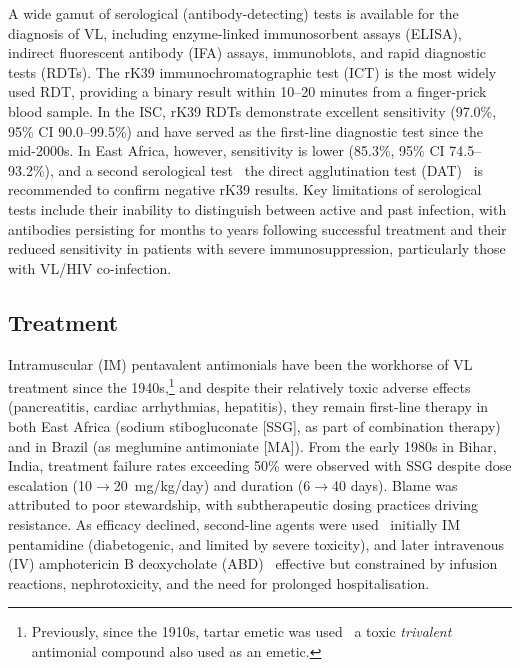 A wide gamut of serological (antibody-detecting) tests is available for the diagnosis of VL, including enzyme-linked immunosorbent assays (ELISA), indirect fluorescent antibody (IFA) assays, immunoblots, and rapid diagnostic tests (RDTs)\cite{farrar2023manson}. The rK39 immunochromatographic test (ICT) is the most widely used RDT, providing a binary result within 10--20 minutes from a finger-prick blood sample. In the ISC, rK39 RDTs demonstrate excellent sensitivity (97.0\%, 95\% CI 90.0--99.5\%)\cite{boelaert2014} and have served as the first-line diagnostic test since the mid-2000s. In East Africa, however, sensitivity is lower (85.3\%, 95\% CI 74.5--93.2\%), and a second serological test \textemdash\  the direct agglutination test (DAT) \textemdash\  is recommended to confirm negative rK39 results\cite{boelaert2014}. Key limitations of serological tests include their inability to distinguish between active and past infection, with antibodies persisting for months to years following successful treatment and their reduced sensitivity in patients with severe immunosuppression, particularly those with VL/HIV co-infection\cite{burza2018}.


\subsection{Treatment}

Intramuscular (IM) pentavalent antimonials have been the workhorse of VL treatment since the 1940s,\footnote{Previously, since the 1910s, tartar emetic was used \textemdash\ a toxic \textit{trivalent} antimonial compound also used as an emetic.} and despite their relatively toxic adverse effects (pancreatitis, cardiac arrhythmias, hepatitis), they remain first-line therapy in both East Africa (sodium stibogluconate [SSG], as part of combination therapy) and in Brazil (as meglumine antimoniate [MA])\cite{WHO_TRS_949_2010,Brasil_2024_GuiaVigilanciaSaude}. From the early 1980s in Bihar, India, treatment failure rates exceeding 50\% were observed with SSG despite dose escalation (10$\rightarrow$20~mg/kg/day) and duration (6$\rightarrow$40 days). Blame was attributed to poor stewardship, with subtherapeutic dosing practices driving resistance\cite{sundar2001}. As efficacy declined, second-line agents were used \textemdash\ initially IM pentamidine (diabetogenic, and limited by severe toxicity), and later intravenous (IV) amphotericin B deoxycholate (ABD) \textemdash\ effective but constrained by infusion reactions, nephrotoxicity, and the need for prolonged hospitalisation.

